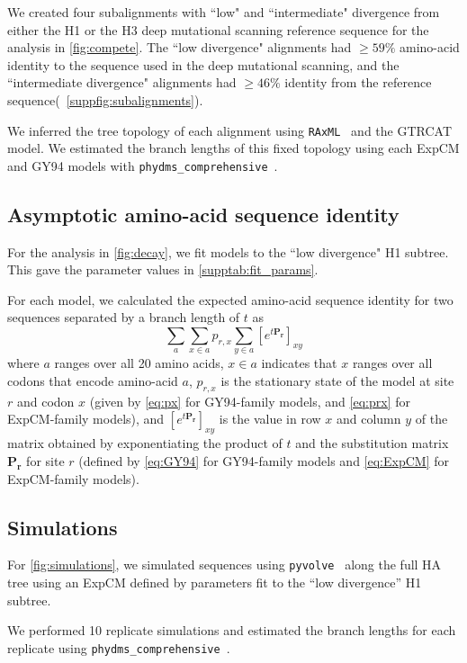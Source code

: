 \documentclass[11pt]{article}
\begin{document}
We created four subalignments with ``low" and ``intermediate" divergence from either the H1 or the H3 deep mutational scanning reference sequence for the analysis in \ref{fig:compete}. 
The ``low divergence" alignments had $\ge 59\%$ amino-acid identity to the sequence used in the deep mutational scanning, and the ``intermediate divergence" alignments had $\ge 46\%$ identity from the reference sequence(~\ref{suppfig:subalignments}).

We inferred the tree topology of each alignment using \texttt{RAxML}~\citep{stamatakis2006raxml} and the GTRCAT model. 
We estimated the branch lengths of this fixed topology using each ExpCM and GY94 models with \texttt{phydms\_comprehensive}~\citep{hilton2017phydms}. 

\subsection*{Asymptotic amino-acid sequence identity}
For the analysis in \ref{fig:decay}, we fit models to the ``low divergence" H1 subtree.
This gave the parameter values in \ref{supptab:fit_params}. 

For each model, we calculated the expected amino-acid sequence identity for two sequences separated by a branch length of $t$ as 
\begin{equation}
\label{eq:f}
\sum_a \sum_{x \in a} p_{r,x} \sum_{y \in a} \left[e^{t\mathbf{P_r}}\right]_{xy}
\end{equation}
where $a$ ranges over all 20 amino acids, $x \in a$ indicates that $x$ ranges over all codons that encode amino-acid $a$, $p_{r,x}$ is the stationary state of the model at site $r$ and codon $x$ (given by \ref{eq:px} for GY94-family models, and \ref{eq:prx} for ExpCM-family models), and $\left[e^{t\mathbf{P_r}}\right]_{xy}$ is the value in row $x$ and column $y$ of the matrix obtained by exponentiating the product of $t$ and the substitution matrix $\mathbf{P_r}$ for site $r$ (defined by \ref{eq:GY94} for GY94-family models and \ref{eq:ExpCM} for ExpCM-family models).

\subsection*{Simulations}
For \ref{fig:simulations}, we simulated sequences using \texttt{pyvolve}~\citep{spielman2015pyvolve} along the full HA tree using an ExpCM defined by parameters fit to the ``low divergence'' H1 subtree. 

We performed 10 replicate simulations and estimated the branch lengths for each replicate using \texttt{phydms\_comprehensive}~\citep{hilton2017phydms}. 
\end{document}
